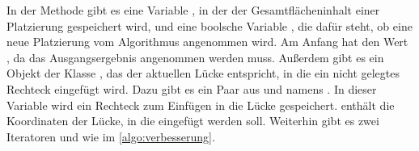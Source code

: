 In der Methode  gibt es eine Variable ,
in der der Gesamtflächeninhalt einer Platzierung gespeichert wird, und 
eine boolsche Variable , die dafür steht,
ob eine neue Platzierung vom Algorithmus angenommen wird.
Am Anfang hat  den Wert , da das Ausgangsergebnis
angenommen werden muss.
Außerdem gibt es ein Objekt  der Klasse , das 
der aktuellen Lücke entspricht, in die ein nicht gelegtes Rechteck eingefügt wird.
Dazu gibt es ein Paar aus  und  namens .
In dieser Variable wird ein Rechteck zum Einfügen in die Lücke  gespeichert.
 enthält die Koordinaten der Lücke, in die  eingefügt
werden soll.
Weiterhin gibt es zwei Iteratoren  und  wie im \cref{algo:verbesserung}.

